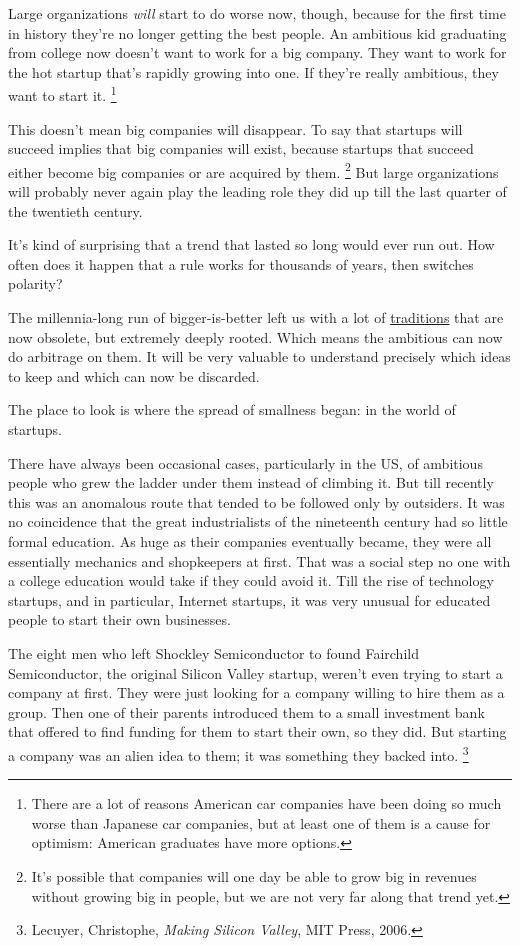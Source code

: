 Large organizations \emph{will} start to do worse now, though, because
for the first time in history they're no longer getting the best people.
An ambitious kid graduating from college now doesn't want to work for a
big company. They want to work for the hot startup that's rapidly
growing into one. If they're really ambitious, they want to start it.
\footnote{There are a lot of reasons American car companies have been
doing so much worse than Japanese car companies, but at least one of
them is a cause for optimism: American graduates have more options.}

This doesn't mean big companies will disappear. To say that startups
will succeed implies that big companies will exist, because startups
that succeed either become big companies or are acquired by them.
\footnote{It's possible that companies will one day be able to grow big in
revenues without growing big in people, but we are not very far along
that trend yet.} But large organizations will probably never
again play the leading role they did up till the last quarter of the
twentieth century.

It's kind of surprising that a trend that lasted so long would ever run
out. How often does it happen that a rule works for thousands of years,
then switches polarity?

The millennia-long run of bigger-is-better left us with a lot of
\href{credentials.html}{traditions} that are now obsolete, but extremely
deeply rooted. Which means the ambitious can now do arbitrage on them.
It will be very valuable to understand precisely which ideas to keep and
which can now be discarded.

The place to look is where the spread of smallness began: in the world
of startups.

There have always been occasional cases, particularly in the US, of
ambitious people who grew the ladder under them instead of climbing it.
But till recently this was an anomalous route that tended to be followed
only by outsiders. It was no coincidence that the great industrialists
of the nineteenth century had so little formal education. As huge as
their companies eventually became, they were all essentially mechanics
and shopkeepers at first. That was a social step no one with a college
education would take if they could avoid it. Till the rise of technology
startups, and in particular, Internet startups, it was very unusual for
educated people to start their own businesses.

The eight men who left Shockley Semiconductor to found Fairchild
Semiconductor, the original Silicon Valley startup, weren't even trying
to start a company at first. They were just looking for a company
willing to hire them as a group. Then one of their parents introduced
them to a small investment bank that offered to find funding for them to
start their own, so they did. But starting a company was an alien idea
to them; it was something they backed into. \footnote{Lecuyer, Christophe, \emph{Making Silicon Valley}, MIT Press,
2006.}

